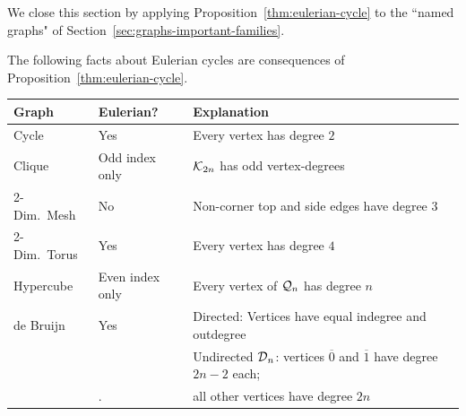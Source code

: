 \bigskip

We close this section by applying Proposition~\ref{thm:eulerian-cycle}
to the ``named graphs" of Section~\ref{sec:graphs-important-families}.

\medskip

\begin{corol}
\label{corol:eulerian-named-graphs}
The following facts about Eulerian cycles are consequences of Proposition~\ref{thm:eulerian-cycle}.

\medskip

{\small
\begin{tabular}{|l|l|l|}
\hline
Graph & Eulerian? & Explanation \\
\hline \hline
Cycle                          & Yes                          & Every vertex has degree $2$ \\
\hline
Clique                         & Odd index only       & $\mbox{$\cal K$}_{2n}$ has odd vertex-degrees \\
\hline
2-Dim.~Mesh  & No                           & Non-corner top and side edges have degree $3$ \\  
\hline                     
2-Dim.~Torus  & Yes                          & Every vertex has degree $4$ \\
\hline
Hypercube                  & Even index only & Every vertex of $\mbox{$\cal Q$}_n$ has degree $n$ \\
\hline
de Bruijn                     & Yes  & Directed: Vertices have equal {\sc indegree} and {\sc outdegree} \\
                                   &         & Undirected $\mbox{$\cal D$}_n$: vertices $\overline{0}$ and $\overline{1}$ have
                                                  degree $2n-2$ each; \\
                                    &.       & \hspace*{.77in}all other vertices have degree $2n$ \\
\hline
\end{tabular}
}
\end{corol}


